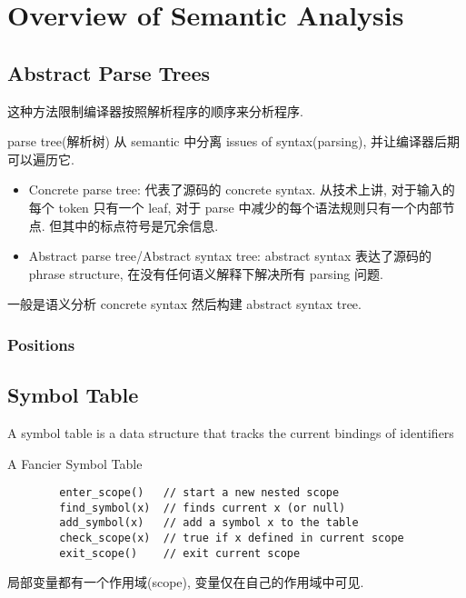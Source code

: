 \newpage
\section{Overview of Semantic Analysis}

\subsection{Abstract Parse Trees}
这种方法限制编译器按照解析程序的顺序来分析程序.

parse tree(解析树) 从 semantic 中分离 issues of syntax(parsing), 并让编译器后期可以遍历它. 
\begin{itemize}
    \item Concrete parse tree: 代表了源码的 concrete syntax. 从技术上讲, 对于输入的每个 token 只有一个 leaf, 对于 parse 中减少的每个语法规则只有一个内部节点. 但其中的标点符号是冗余信息. 
    \item Abstract parse tree/Abstract syntax tree: abstract syntax 表达了源码的 phrase structure, 在没有任何语义解释下解决所有 parsing 问题. 
\end{itemize}
一般是语义分析 concrete syntax 然后构建 abstract syntax tree.

\subsubsection{Positions}

\subsection{Symbol Table}
\begin{definition}
    A symbol table is a data structure that tracks the current bindings of identifiers
\end{definition}


\begin{code}
    \caption{A Fancier Symbol Table}
    \begin{verbatim}
        enter_scope()   // start a new nested scope
        find_symbol(x)  // finds current x (or null)
        add_symbol(x)   // add a symbol x to the table
        check_scope(x)  // true if x defined in current scope
        exit_scope()    // exit current scope
    \end{verbatim}
\end{code}

局部变量都有一个作用域(scope), 变量仅在自己的作用域中可见. 

